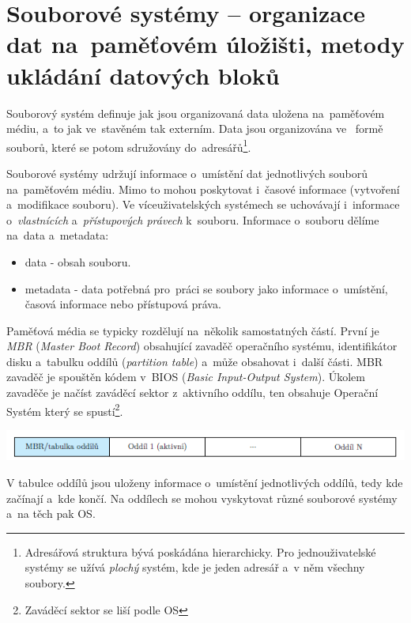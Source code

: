 
\clearpage
\section{Souborové systémy -- organizace dat na~paměťovém úložišti, metody ukládání datových bloků}

Souborový systém definuje jak jsou organizovaná data uložena na~paměťovém médiu, a~to jak ve~stavěném tak externím. Data jsou organizována ve~ formě souborů, které se potom sdružovány do~adresářů\footnote{Adresářová struktura bývá poskádána hierarchicky. Pro jednouživatelské systémy se užívá \emph{plochý} systém, kde je jeden adresář a~v něm všechny soubory.}. 

\vspace{0,5cm}

Souborové systémy udržují informace o~umístění dat jednotlivých souborů na~paměťovém médiu. Mimo to mohou poskytovat i~časové informace (vytvoření a~modifikace souboru). Ve víceuživatelských systémech se uchovávají i~informace o~\emph{vlastnících} a~\emph{přístupových právech} k~souboru. Informace o~souboru dělíme na~data a~metadata:
\begin{itemize}
    \item data - obsah souboru.
    \item metadata - data potřebná pro~práci se soubory jako informace o~umístění, časová informace nebo přístupová práva. 
\end{itemize}

Paměťová média se typicky rozdělují na~několik samostatných částí. První je \emph{MBR} (\emph{Master Boot Record}) obsahující zavaděč operačního systému, identifikátor disku a~tabulku oddílů (\emph{partition table}) a~může obsahovat i~další části. MBR zavaděč je spouštěn kódem v~BIOS (\emph{Basic Input-Output System}). Úkolem zavaděče je načíst zaváděcí sektor z~aktivního oddílu, ten obsahuje Operační Systém který se spustí\footnote{Zaváděcí sektor se liší podle OS}. 

\begin{center}
    \includegraphics[scale=1]{images/mem_partitions.png}
\end{center}

V tabulce oddílů jsou uloženy informace o~umístění jednotlivých oddílů, tedy kde začínají a~kde končí. Na oddílech se mohou vyskytovat různé souborové systémy a~na těch pak OS.

